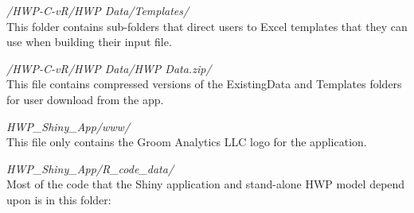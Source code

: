 \documentclass[
  openany]{book}
\begin{document}
\emph{/HWP-C-vR/HWP Data/Templates/}\\
This folder contains sub-folders that direct users to Excel templates that they can use when building their input file.

\emph{/HWP-C-vR/HWP Data/HWP Data.zip/}\\
This file contains compressed versions of the ExistingData and Templates folders for user download from the app.

\emph{HWP\_Shiny\_App/www/}\\
This file only contains the Groom Analytics LLC logo for the application.

\emph{HWP\_Shiny\_App/R\_code\_data/}\\
Most of the code that the Shiny application and stand-alone HWP model depend upon is in this folder:
\end{document}
